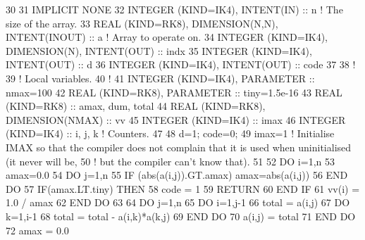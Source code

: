 \begin{DoxyCode}
30 
31 \textcolor{keywordtype}{IMPLICIT NONE}
32 \textcolor{keywordtype}{INTEGER (KIND=IK4)}, \textcolor{keywordtype}{INTENT(IN)}                  :: n        \textcolor{comment}{! The size of the array.}
33 \textcolor{keywordtype}{REAL (KIND=RK8)}, \textcolor{keywordtype}{DIMENSION(N,N)}, \textcolor{keywordtype}{INTENT(INOUT)}  :: a        \textcolor{comment}{! Array to operate on.}
34 \textcolor{keywordtype}{INTEGER (KIND=IK4)}, \textcolor{keywordtype}{DIMENSION(N)}, \textcolor{keywordtype}{INTENT(OUT)}   :: indx
35 \textcolor{keywordtype}{INTEGER (KIND=IK4)}, \textcolor{keywordtype}{INTENT(OUT)}                 :: d
36 \textcolor{keywordtype}{INTEGER (KIND=IK4)}, \textcolor{keywordtype}{INTENT(OUT)}                 :: code
37 
38 \textcolor{comment}{!}
39 \textcolor{comment}{! Local variables.}
40 \textcolor{comment}{!}
41 \textcolor{keywordtype}{INTEGER (KIND=IK4)}, \textcolor{keywordtype}{PARAMETER}                   :: nmax=100
42 \textcolor{keywordtype}{REAL (KIND=RK8)}, \textcolor{keywordtype}{PARAMETER}                      :: tiny=1.5e-16
43 \textcolor{keywordtype}{REAL (KIND=RK8)}                                 :: amax, dum, total
44 \textcolor{keywordtype}{REAL (KIND=RK8)}, \textcolor{keywordtype}{DIMENSION(NMAX)}                :: vv
45 \textcolor{keywordtype}{INTEGER (KIND=IK4)}                              :: imax
46 \textcolor{keywordtype}{INTEGER (KIND=IK4)}                              :: i, j, k                               \textcolor{comment}{! Counters.}
47 
48 d=1; code=0; 
49 imax=1          \textcolor{comment}{! Initialise IMAX so that the compiler does not complain that it is used when uninitialised
       (it never will be,}
50                 \textcolor{comment}{! but the compiler can't know that).}
51 
52 \textcolor{keywordflow}{DO} i=1,n
53     amax=0.0
54     \textcolor{keywordflow}{DO} j=1,n
55         \textcolor{keywordflow}{IF} (abs(a(i,j)).GT.amax) amax=abs(a(i,j))
56 \textcolor{keywordflow}{    END DO}
57     \textcolor{keywordflow}{IF}(amax.LT.tiny) \textcolor{keywordflow}{THEN}
58         code = 1
59         \textcolor{keywordflow}{RETURN}
60 \textcolor{keywordflow}{    END IF}
61     vv(i) = 1.0 / amax
62 \textcolor{keywordflow}{END DO}
63 
64 \textcolor{keywordflow}{DO} j=1,n
65     \textcolor{keywordflow}{DO} i=1,j-1
66         total = a(i,j)
67         \textcolor{keywordflow}{DO} k=1,i-1
68             total = total - a(i,k)*a(k,j) 
69 \textcolor{keywordflow}{        END DO}
70         a(i,j) = total
71 \textcolor{keywordflow}{    END DO}
72     amax = 0.0

\end{DoxyCode}
